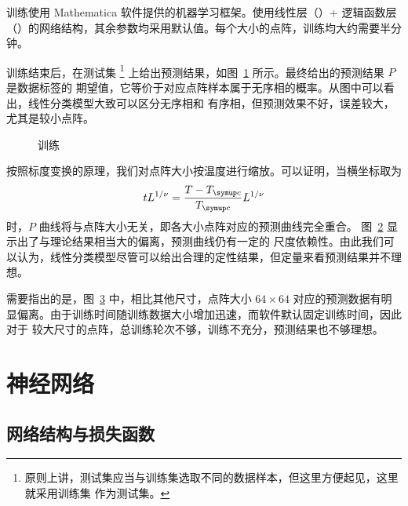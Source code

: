 训练使用 Mathematica 软件提供的机器学习框架。使用线性层（）+ 逻辑函数层
（）的网络结构，其余参数均采用默认值。每个大小的点阵，训练均大约需要半分钟。

训练结束后，在测试集
\footnote{原则上讲，测试集应当与训练集选取不同的数据样本，但这里方便起见，这里就采用训练集
  作为测试集。}
上给出预测结果，如图~\ref{fig:ising-learning-linear} 所示。最终给出的预测结果 $P$ 是数据标签的
期望值，它等价于对应点阵样本属于无序相的概率。从图中可以看出，线性分类模型大致可以区分无序相和
有序相，但预测效果不好，误差较大，尤其是较小点阵。

\begin{figure}[htb]
  \centering
  \begin{subfigure}[b]{0.47\textwidth}
    \centering
    \label{fig:ising-learning-linear}
  \end{subfigure}
  \begin{subfigure}[b]{0.47\textwidth}
    \centering
    \label{fig:ising-learning-linear-scaled}
  \end{subfigure}
  \caption{训练}
  \label{fig:ising-learning-linear-total}
\end{figure}

按照标度变换的原理，我们对点阵大小按温度进行缩放。可以证明，当横坐标取为
\begin{equation}
  tL^{1/\nu} = \frac{T-\Tc}{\Tc} L^{1/\nu}
\end{equation}
时，$P$ 曲线将与点阵大小无关，即各大小点阵对应的预测曲线完全重合。
图~\ref{fig:ising-learning-linear-scaled} 显示出了与理论结果相当大的偏离，预测曲线仍有一定的
尺度依赖性。由此我们可以认为，线性分类模型尽管可以给出合理的定性结果，但定量来看预测结果并不理想。

需要指出的是，图~\ref{fig:ising-learning-linear-total} 中，相比其他尺寸，点阵大小 $64 \times 64$
对应的预测数据有明显偏离。由于训练时间随训练数据大小增加迅速，而软件默认固定训练时间，因此对于
较大尺寸的点阵，总训练轮次不够，训练不充分，预测结果也不够理想。

\section{神经网络}

\subsection{网络结构与损失函数}

